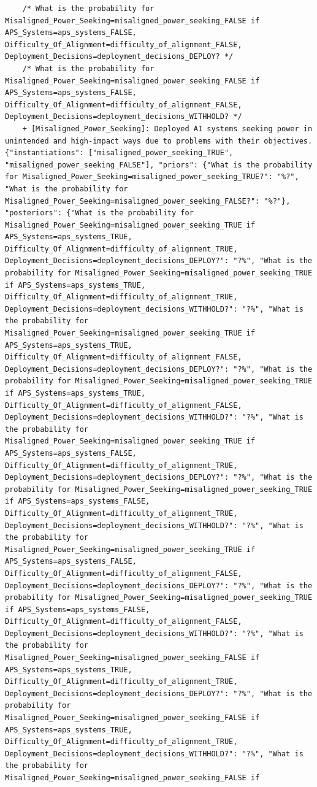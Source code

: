 \documentclass[
  11pt,
  letterpaper,
]{book}
\begin{document}
\begin{verbatim}
    /* What is the probability for Misaligned_Power_Seeking=misaligned_power_seeking_FALSE if APS_Systems=aps_systems_FALSE, Difficulty_Of_Alignment=difficulty_of_alignment_FALSE, Deployment_Decisions=deployment_decisions_DEPLOY? */
    /* What is the probability for Misaligned_Power_Seeking=misaligned_power_seeking_FALSE if APS_Systems=aps_systems_FALSE, Difficulty_Of_Alignment=difficulty_of_alignment_FALSE, Deployment_Decisions=deployment_decisions_WITHHOLD? */
    + [Misaligned_Power_Seeking]: Deployed AI systems seeking power in unintended and high-impact ways due to problems with their objectives. {"instantiations": ["misaligned_power_seeking_TRUE", "misaligned_power_seeking_FALSE"], "priors": {"What is the probability for Misaligned_Power_Seeking=misaligned_power_seeking_TRUE?": "%?", "What is the probability for Misaligned_Power_Seeking=misaligned_power_seeking_FALSE?": "%?"}, "posteriors": {"What is the probability for Misaligned_Power_Seeking=misaligned_power_seeking_TRUE if APS_Systems=aps_systems_TRUE, Difficulty_Of_Alignment=difficulty_of_alignment_TRUE, Deployment_Decisions=deployment_decisions_DEPLOY?": "?%", "What is the probability for Misaligned_Power_Seeking=misaligned_power_seeking_TRUE if APS_Systems=aps_systems_TRUE, Difficulty_Of_Alignment=difficulty_of_alignment_TRUE, Deployment_Decisions=deployment_decisions_WITHHOLD?": "?%", "What is the probability for Misaligned_Power_Seeking=misaligned_power_seeking_TRUE if APS_Systems=aps_systems_TRUE, Difficulty_Of_Alignment=difficulty_of_alignment_FALSE, Deployment_Decisions=deployment_decisions_DEPLOY?": "?%", "What is the probability for Misaligned_Power_Seeking=misaligned_power_seeking_TRUE if APS_Systems=aps_systems_TRUE, Difficulty_Of_Alignment=difficulty_of_alignment_FALSE, Deployment_Decisions=deployment_decisions_WITHHOLD?": "?%", "What is the probability for Misaligned_Power_Seeking=misaligned_power_seeking_TRUE if APS_Systems=aps_systems_FALSE, Difficulty_Of_Alignment=difficulty_of_alignment_TRUE, Deployment_Decisions=deployment_decisions_DEPLOY?": "?%", "What is the probability for Misaligned_Power_Seeking=misaligned_power_seeking_TRUE if APS_Systems=aps_systems_FALSE, Difficulty_Of_Alignment=difficulty_of_alignment_TRUE, Deployment_Decisions=deployment_decisions_WITHHOLD?": "?%", "What is the probability for Misaligned_Power_Seeking=misaligned_power_seeking_TRUE if APS_Systems=aps_systems_FALSE, Difficulty_Of_Alignment=difficulty_of_alignment_FALSE, Deployment_Decisions=deployment_decisions_DEPLOY?": "?%", "What is the probability for Misaligned_Power_Seeking=misaligned_power_seeking_TRUE if APS_Systems=aps_systems_FALSE, Difficulty_Of_Alignment=difficulty_of_alignment_FALSE, Deployment_Decisions=deployment_decisions_WITHHOLD?": "?%", "What is the probability for Misaligned_Power_Seeking=misaligned_power_seeking_FALSE if APS_Systems=aps_systems_TRUE, Difficulty_Of_Alignment=difficulty_of_alignment_TRUE, Deployment_Decisions=deployment_decisions_DEPLOY?": "?%", "What is the probability for Misaligned_Power_Seeking=misaligned_power_seeking_FALSE if APS_Systems=aps_systems_TRUE, Difficulty_Of_Alignment=difficulty_of_alignment_TRUE, Deployment_Decisions=deployment_decisions_WITHHOLD?": "?%", "What is the probability for Misaligned_Power_Seeking=misaligned_power_seeking_FALSE if 
\end{verbatim}
\end{document}
